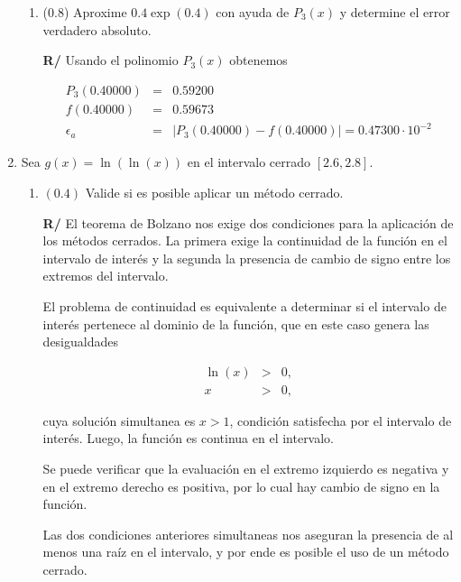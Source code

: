 \documentclass[12pt]{article}
\begin{document}
\begin{enumerate}[leftmargin=*,widest=9]
\begin{enumerate}[label=\alph*]
    \item (\(0.8\)) Aproxime \(0.4 \exp(0.4)\) con ayuda de \(P_3(x)\) y determine el error verdadero absoluto.
    
   \textbf{R/} Usando el polinomio \(P_3(x)\) obtenemos
   
   \begin{eqnarray*}
   P_3(0.40000) & = & 0.59200 \\
   f(0.40000) & = & 0.59673 \\
   \epsilon_a & = & | P_3(0.40000) - f(0.40000) | = 0.47300 \cdot 10^{-2}
\end{eqnarray*}      
   
   \end{enumerate}
   
   \item Sea \(g(x) = \ln(\ln(x)) \) en el intervalo cerrado \( [2.6, 2.8] \).
   \begin{enumerate}[label=\alph*]
   
   \item \((0.4)\) Valide si es posible aplicar un método cerrado.
   
   
\textbf{R/} El teorema de Bolzano nos exige dos condiciones para la aplicación de los métodos cerrados. La primera exige la continuidad de la función en el intervalo de interés y la segunda la presencia de cambio de signo entre los extremos del intervalo.
   
El problema de continuidad es equivalente a determinar si el intervalo de interés pertenece al dominio de la función, que en este caso genera las desigualdades

\begin{eqnarray*}
\ln(x) & > & 0, \\
x & > & 0,
\end{eqnarray*}

cuya solución simultanea es \( x > 1 \), condición satisfecha por el intervalo de interés. Luego, la función es continua en el intervalo.

Se puede verificar que la evaluación en el extremo izquierdo es negativa y en el extremo derecho es positiva, por lo cual hay cambio de signo en la función.

Las dos condiciones anteriores simultaneas nos aseguran la presencia de al menos una raíz en el intervalo, y por ende es posible el uso de un método cerrado.
   

\end{enumerate}
\end{enumerate}
\end{document}

